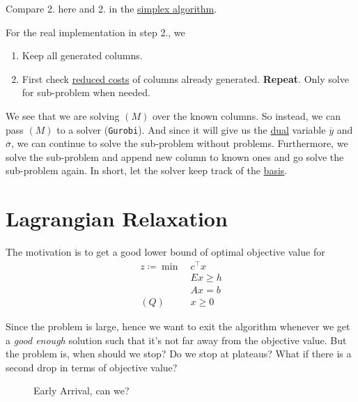 \begin{note}
	Compare 2. here and 2. in the \hyperref[algo:simplex-algorithm]{simplex algorithm}.
\end{note}
\begin{remark}
	For the real implementation in step 2., we
	\begin{enumerate}
		\item Keep all generated columns.
		\item First check \hyperref[def:reduced-cost]{reduced costs} of columns already generated. \textbf{Repeat}. Only solve for sub-problem when needed.
	\end{enumerate}

	\begin{note}
		We see that we are solving \((M)\) over the known columns. So instead, we can pass \((M)\) to a solver (\texttt{Gurobi}). And since
		it will give us the \hyperref[def:dual]{dual} variable \(\overline{y}\) and \(\overline{\sigma}\), we can continue to solve the sub-problem without problems.
		Furthermore, we solve the sub-problem and append new column to known ones and go solve the sub-problem again. In short, let the solver
		keep track of the \hyperref[def:basic]{basis}.
	\end{note}
\end{remark}

\section{Lagrangian Relaxation}
The motivation is to get a good lower bound of optimal objective value for
\[
	\begin{aligned}
		z\coloneqq \min~ & c^{\top}x \\
		                 & Ex \geq h \\
		                 & Ax = b    \\
		(Q)\quad         & x\geq 0
	\end{aligned}
\]

Since the problem is large, hence we want to exit the algorithm whenever we get a \emph{good enough} solution such that it's not far away from the objective
value. But the problem is, when should we stop? Do we stop at plateaus? What if there is a second drop in terms of objective value?

\begin{figure}[H]
	\centering
	\caption{Early Arrival, can we?}
	\label{fig:plateau}
\end{figure}


